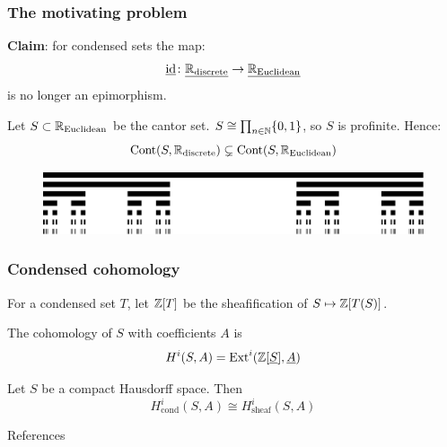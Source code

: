 \documentclass{beamer}
\DeclareMathOperator{\Cont}{Cont}
\DeclareMathOperator{\id}{id}
\begin{document}
\begin{frame}
    \frametitle{The motivating problem}

    \textbf{Claim}: for condensed sets the map:
    \begin{equation*}
        \underline{\id} \colon \underline{\bbR_{\text{discrete}}} \to \underline{\bbR_{\text{Euclidean}}}
    \end{equation*}
    is no longer an epimorphism.
    \pause

    \medskip
    Let $S \subset \mathbb{R}_{\text{Euclidean}}$ be the cantor set.
    $ S \cong \prod_{n\in \mathbb{N}}\{0,1\}$,
    so $S$ is profinite.
    Hence:
    \begin{equation*}
        \Cont(S, \bbR_{\text{discrete}}) \subsetneq \Cont(S, \bbR_{\text{Euclidean}})
    \end{equation*}

    \begin{figure}
        \centering
        \includegraphics[scale=0.5]{Cantor_set_in_seven_iterations.pdf}
    \end{figure}
\end{frame}

\begin{frame}
    \frametitle{Condensed cohomology}

    For a condensed set $T$, let $\mathbb{Z}[T]$ be the sheafification
    of $S \mapsto \mathbb{Z}[T(S)]$.
    \begin{definition}
        The cohomology of $S$ with coefficients $A$ is
        \begin{equation*}
            H^i (S, A) = \operatorname{Ext}^i(\mathbb{Z}[\underline{S}], \underline{A})
        \end{equation*}
    \end{definition}

    \pause
    \begin{theorem}
        Let $S$ be a compact Hausdorff space. Then
        \begin{equation*}
            H^i_{\text{cond}}(S, A) \cong H^i_{\text{sheaf}}(S, A)
        \end{equation*}
    \end{theorem}

\end{frame}


\begin{frame}{References}
    \nocite{Sch2019LecturesCM}
    \nocite{Apa2021condensed}
    \nocite{stacks-project}
    \nocite{Sch2020MasterClass}
    
\end{frame}
\end{document}
